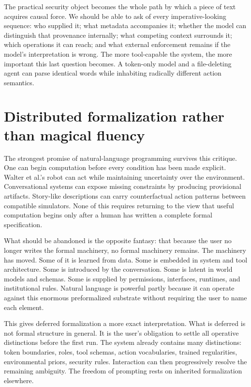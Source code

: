 \documentclass[11pt]{article}
\begin{document}
The practical security object becomes the whole path by which a piece of text acquires causal force. We should be able to ask of every imperative-looking sequence: who supplied it; what metadata accompanies it; whether the model can distinguish that provenance internally; what competing context surrounds it; which operations it can reach; and what external enforcement remains if the model's interpretation is wrong. The more tool-capable the system, the more important this last question becomes. A token-only model and a file-deleting agent can parse identical words while inhabiting radically different action semantics.

\section{Distributed formalization rather than magical fluency}

The strongest promise of natural-language programming survives this critique. One can begin computation before every condition has been made explicit. Walter et al.'s robot can act while maintaining uncertainty over the environment. Conversational systems can expose missing constraints by producing provisional artifacts. Story-like descriptions can carry counterfactual action patterns between compatible simulators. None of this requires returning to the view that useful computation begins only after a human has written a complete formal specification.

What should be abandoned is the opposite fantasy: that because the user no longer writes the formal machinery, no formal machinery remains. The machinery has moved. Some of it is learned from data. Some is embedded in system and tool architecture. Some is introduced by the conversation. Some is latent in world models and schemas. Some is supplied by permissions, interfaces, runtimes, and institutional rules. Natural language is powerful partly because it can operate against this enormous preformalized substrate without requiring the user to name each element.

This gives deferred formalization a more exact interpretation. What is deferred is not formal structure in general. It is the user's obligation to settle all operative distinctions before the first run. The system already contains many distinctions: token boundaries, roles, tool schemas, action vocabularies, trained regularities, environmental priors, security rules. Interaction can then progressively resolve the remaining ambiguity. The freedom of prompting rests on inherited formalization elsewhere.
\end{document}
